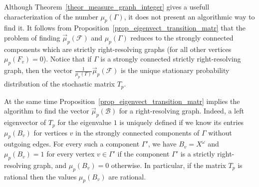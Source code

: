 \documentclass[12pt]{article}
\newcommand{\xo}{X^\omega}
\newcommand{\gr}{\Gamma}
\newcommand{\B}{\mathscr{B}}
\newcommand{\F}{\mathscr{F}}
\newtheorem{prop}[theor]{Proposition}
\theoremstyle{definition}
\newtheorem{remark}{Remark}
\begin{document}
Although Theorem~\ref{theor_measure_graph_integer} gives a usefull characterization of the number
$\mu_p(\gr)$, it does not present an algorithmic way to find it. It follows from
Proposition~\ref{prop_eigenvect_transition_matr} that the problem of finding $\vec\mu_p(\F)$ and
$\mu_p(\gr)$ reduces to the strongly connected components which are strictly right-resolving graphs
(for all other vertices $\mu_p(F_v)=0$). Notice that if $\gr$ is a strongly connected strictly
right-resolving graph, then the vector $\frac{1}{\mu_p(\gr)}\vec \mu_p(\F)$ is the unique
stationary probability distribution of the stochastic matrix $T_p$.


At the same time Proposition~\ref{prop_eigenvect_transition_matr} implies the algorithm to find the
vector $\vec\mu_p(\B)$ for a right-resolving graph. Indeed, a left eigenvector of $T_p$ for the
eigenvalue $1$ is uniquely defined if we know its entries $\mu_p(B_v)$ for vertices $v$ in the
strongly connected components of $\gr$ without outgoing edges. For every such a component $\gr'$,
we have $B_v=\xo$ and $\mu_p(B_v)=1$ for every vertex $v\in\gr'$ if the component $\gr'$ is a
strictly right-resolving graph, and $\mu_p(B_v)=0$ otherwise. In particular, if the matrix $T_p$ is
rational then the values $\mu_p(B_v)$ are rational.





%
%
%
\end{document}
